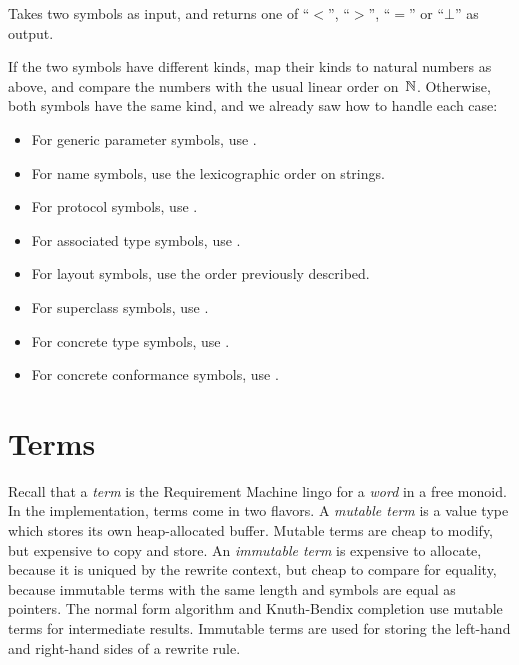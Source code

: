 \documentclass[../generics]{subfiles}
\begin{document}
\begin{algorithm}\label{symbol reduction order}
Takes two symbols as input, and returns one of ``$<$'', ``$>$'', ``$=$'' or ``$\bot$'' as output.

If the two symbols have different kinds, map their kinds to natural numbers as above, and compare the numbers with the usual linear order on~$\mathbb{N}$. Otherwise, both symbols have the same kind, and we already saw how to handle each case:
\begin{itemize}
\item For generic parameter symbols, use .
\item For name symbols, use the lexicographic order on strings.
\item For protocol symbols, use .
\item For associated type symbols, use .
\item For layout symbols, use the order previously described.
\item For superclass symbols, use .
\item For concrete type symbols, use .
\item For concrete conformance symbols, use .
\end{itemize}
\end{algorithm}

\section{Terms}\label{sec:rqm terms}

Recall that a \emph{term} is the Requirement Machine lingo for a \emph{word} in a free monoid. In the implementation, terms come in two flavors. A \emph{mutable term} is a value type which stores its own heap-allocated buffer. Mutable terms are cheap to modify, but expensive to copy and store. An \emph{immutable term} is expensive to allocate, because it is uniqued by the rewrite context, but cheap to compare for equality, because immutable terms with the same length and symbols are equal as pointers. The normal form algorithm and Knuth-Bendix completion use mutable terms for intermediate results. Immutable terms are used for storing the left-hand and right-hand sides of a rewrite rule.
\end{document}
